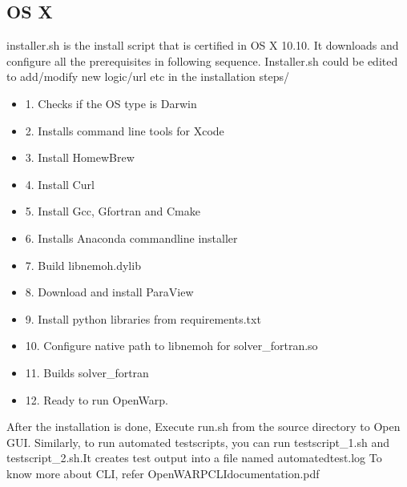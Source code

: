 \documentclass[12pt]{article}
\begin{document}
\subsection{OS X}
installer.sh is the install script that is certified in OS X 10.10. It downloads and configure all the prerequisites in following sequence. Installer.sh could be edited to add/modify new logic/url etc in the installation steps/
\begin{itemize}
\item 1. Checks if the OS type is Darwin
\item 2. Installs command line tools for Xcode
\item 3. Install HomewBrew
\item 4. Install Curl
\item 5. Install Gcc, Gfortran and Cmake
\item 6. Installs Anaconda commandline installer
\item 7. Build libnemoh.dylib
\item 8. Download and install ParaView
\item 9. Install python libraries from requirements.txt
\item 10. Configure native path to libnemoh for solver_fortran.so
\item 11. Builds solver_fortran
\item 12. Ready to run OpenWarp.
\end{itemize}
After the installation is done, Execute run.sh from the source directory to Open GUI.
 Similarly, to run automated testscripts, you can run testscript_1.sh and testscript_2.sh.It creates test output into a file named automatedtest.log To know more about CLI, refer OpenWARPCLIdocumentation.pdf
\end{document}
